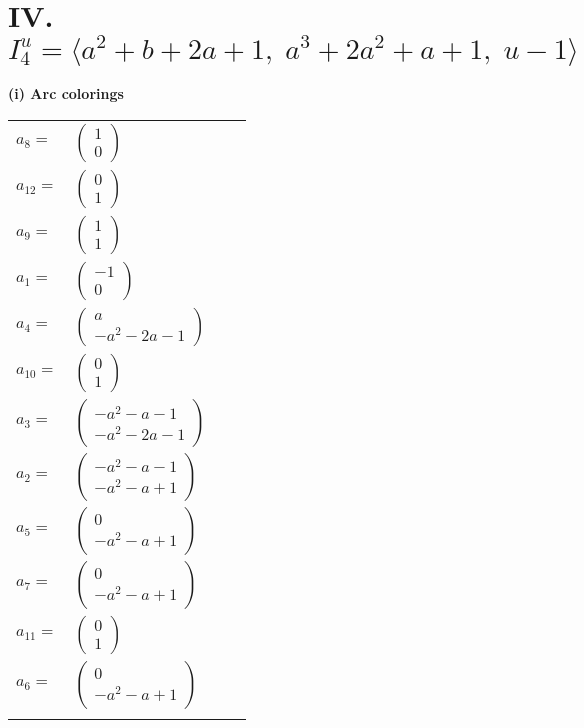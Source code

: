 \documentclass[1p]{elsarticle_modified}
\theoremstyle{definition}
\begin{document}
\centering \section*{IV. $I^u_{4}= \langle a^2+b+2 a+1,\;a^3+2 a^2+a+1,\;u-1 \rangle$}
\flushleft \textbf{(i) Arc colorings}\\
\begin{tabular}{m{7pt} m{180pt} m{7pt} m{180pt} }
\flushright $a_{8}=$&$\begin{pmatrix}1\\0\end{pmatrix}$ \\
\flushright $a_{12}=$&$\begin{pmatrix}0\\1\end{pmatrix}$ \\
\flushright $a_{9}=$&$\begin{pmatrix}1\\1\end{pmatrix}$ \\
\flushright $a_{1}=$&$\begin{pmatrix}-1\\0\end{pmatrix}$ \\
\flushright $a_{4}=$&$\begin{pmatrix}a\\- a^2-2 a-1\end{pmatrix}$ \\
\flushright $a_{10}=$&$\begin{pmatrix}0\\1\end{pmatrix}$ \\
\flushright $a_{3}=$&$\begin{pmatrix}- a^2- a-1\\- a^2-2 a-1\end{pmatrix}$ \\
\flushright $a_{2}=$&$\begin{pmatrix}- a^2- a-1\\- a^2- a+1\end{pmatrix}$ \\
\flushright $a_{5}=$&$\begin{pmatrix}0\\- a^2- a+1\end{pmatrix}$ \\
\flushright $a_{7}=$&$\begin{pmatrix}0\\- a^2- a+1\end{pmatrix}$ \\
\flushright $a_{11}=$&$\begin{pmatrix}0\\1\end{pmatrix}$ \\
\flushright $a_{6}=$&$\begin{pmatrix}0\\- a^2- a+1\end{pmatrix}$\\&\end{tabular}
\end{document}
